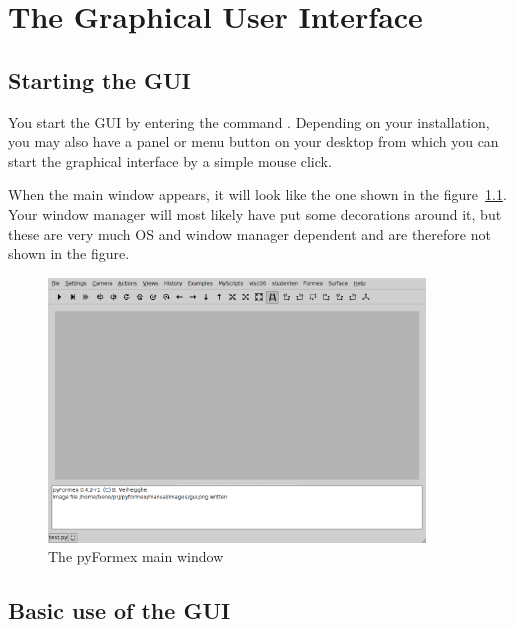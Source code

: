 
\chapter{The Graphical User Interface}
\label{cha:gui}

\section{Starting the GUI}
You start the \pyf GUI by entering the command . Depending on your installation, you may also have a panel or menu button on your desktop from which you can start the \pyf graphical interface by a simple mouse click. 

When the main window appears, it will look like the one shown in the figure~\ref{fig:gui}. Your window manager will most likely have put some decorations around it, but these are very much OS and window manager dependent and are therefore not shown in the figure.

\begin{figure}[h]
  \centering
  \begin{makeimage}
  \end{makeimage}
  \begin{latexonly}
    \includegraphics[width=10cm]{images/gui}
  \end{latexonly}
  \begin{htmlonly}
  \end{htmlonly}  
  \caption{The pyFormex main window}
  \label{fig:gui}
\end{figure}

\section{Basic use of the GUI}


